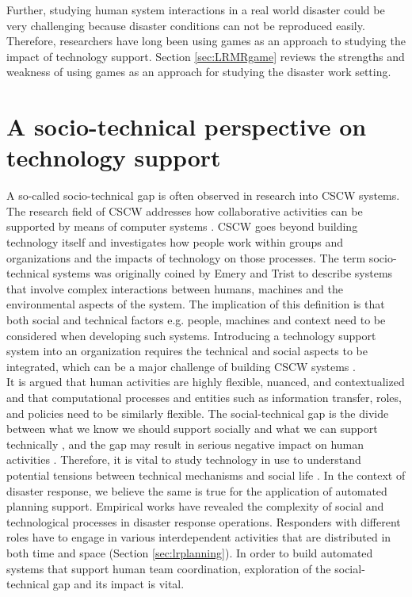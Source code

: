 Further, studying human system interactions in a real world disaster could be very challenging because disaster conditions can not be reproduced easily. Therefore, researchers have long been using games as an approach to studying the impact of technology support.  Section \ref{sec:LRMRgame} reviews the strengths and weakness of using games as an approach for studying the disaster work setting. \\


\section{A socio-technical perspective on technology support} \label{sec:LRSocialTechnical}

A so-called socio-technical gap is often observed in research into \acf{CSCW} systems. The research field of \ac{CSCW} addresses how collaborative activities can be supported by means of computer systems \citep{Carstensen1999}.  \ac{CSCW} goes beyond building technology itself and investigates how people work within groups and organizations and the impacts of technology on those processes. The term socio-technical systems was originally coined by Emery and Trist \citep{Ropohl1999} to describe systems that involve complex interactions between humans, machines and the environmental aspects of the system. The implication of this definition is that both social and technical factors e.g. people, machines and context need to be considered when developing such systems. Introducing a technology support system into an organization requires the technical and social aspects to be integrated, which can be a major challenge of building \ac{CSCW} systems \citep{Ackerman2000}. \\

It is argued \citep{Ackerman2000} that human activities are highly flexible, nuanced, and contextualized and that computational processes and entities such as information transfer, roles, and policies need to be similarly flexible. The social-technical gap is the divide between what we know we should support socially and what we can support technically \citep{Ackerman2000}, and the gap may result in serious negative impact on human activities \citep{Bowers1994,Abbott1994a}. Therefore, it is vital to study technology in use to understand potential tensions between technical mechanisms and social life \citep{Bowers1994}.  In the context of disaster response, we believe the same is true for the application of automated planning support. Empirical works \citep{Kopena2008,Fischer2015,Zerger2003} have revealed the complexity of social and technological processes in disaster response operations. Responders with different roles have to engage in various interdependent activities that are distributed in both time and space (Section \ref{sec:lrplanning}). In order to build automated systems that support human team coordination, exploration of the social-technical gap and its impact is vital. \\ 

